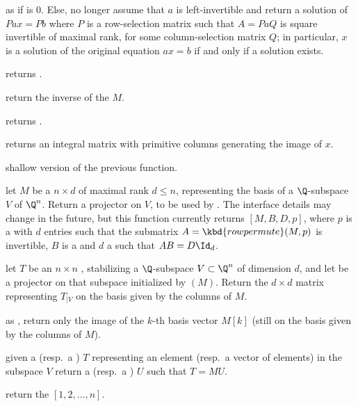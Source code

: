  as  if
 is $0$. Else, no longer assume that $a$ is left-invertible and
return a solution of $P a x = P b$ where $P$ is a row-selection matrix
such that $A = P a Q$ is square invertible of maximal rank, for some
column-selection matrix $Q$; in particular, $x$ is a solution of
the original equation $a x = b$ if and only if a solution exists.

 returns .

 return the inverse of the  $M$.

 returns .

 returns an integral matrix with primitive columns
generating the image of $x$.

 shallow version of the previous function.


 let $M$ be a  $n\times d$  of
maximal rank $d \leq n$, representing the basis of a $\Q$-subspace
$V$ of $\Q^n$. Return a projector on $V$, to be used by .
The interface details may change in the future, but this function currently
returns $[M, B,D,p]$, where $p$ is a  with $d$ entries
such that the submatrix $A = \kbd{rowpermute}(M,p)$ is invertible, $B$ is a
 and $d$ a  such that $A B = D \Id_d$.

 let $T$ be an $n\times n$
, stabilizing a $\Q$-subspace $V\subset \Q^n$ of dimension $d$, and
let  be a projector on that subspace initialized by
$(M)$. Return the $d\times d$ matrix representing $T_{|V}$
on the basis given by the columns of $M$.

 as
, return only the image of the $k$-th basis vector $M[k]$
(still on the basis given by the columns of $M$).

 given a  (resp.~a )
$T$ representing an element (resp.~a vector of elements) in the subspace $V$
return a  (resp.~a ) $U$ such that $T = MU$.


 return the  $[1, 2, \dots, n]$.

